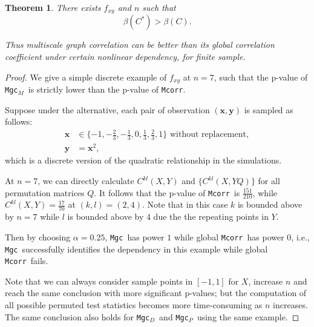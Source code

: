 \documentclass[11pt]{article}
\providecommand{\sct}[1]{{\sc \texttt{#1}}}
\providecommand{\mb}[1]{\boldsymbol{#1}}
\newcommand{\G}{C}
\newcommand{\Mgc}{\sct{Mgc}}
\newcommand{\Mgcp}{\sct{Mgc$_P$}}
\newcommand{\Mgcd}{\sct{Mgc$_D$}}
\newcommand{\Mgcm}{\sct{Mgc$_M$}}
\newcommand{\Mcorr}{\sct{Mcorr}}
\newcommand{\mbx}{\ensuremath{\mb{x}}}
\newcommand{\mby}{\ensuremath{\mb{y}}}
\newtheorem{appThm}{Theorem}
\begin{document}
\begin{appThm}
There exists $f_{xy}$ and $n$ such that
\begin{equation}
\beta(\G^{*}) > \beta(\G).
\end{equation}

Thus multiscale graph correlation can be better than its global correlation coefficient under certain nonlinear dependency, for finite sample.
\end{appThm}

\begin{proof}
We give a simple discrete example of $f_{xy}$ at $n=7$, such that the p-value of \Mgcm~is strictly lower than the p-value of \Mcorr.

Suppose under the alternative, each pair of observation $(\mbx,\mby)$ is sampled as follows:
\begin{align*}
\mbx &\in \{-1,-\frac{2}{3},-\frac{1}{3},0,\frac{1}{3},\frac{2}{3},1\} \mbox{ without replacement}, \\
\mby &= \mbx^2,
\end{align*}
which is a discrete version of the quadratic relationship in the simulations.

At $n=7$, we can directly calculate $\G^{kl}(X, Y)$ and $\{\G^{kl}(X, YQ)\}$ for all permutation matrices $Q$. It follows that the p-value of \Mcorr~is $\frac{151}{210}$, while $\G^{kl}(X, Y)=\frac{17}{70}$ at $(k,l)=(2,4)$. Note that in this case $k$ is bounded above by $n=7$ while $l$ is bounded above by $4$ due the the repeating points in $Y$.

Then by choosing $\alpha=0.25$, \Mgc~has power $1$ while global \Mcorr~has power $0$, i.e., \Mgc~successfully identifies the dependency in this example while global \Mcorr~fails.

Note that we can always consider sample points in $[-1,1]$ for $X$, increase $n$ and reach the same conclusion with more significant p-values; but the computation of all possible permuted test statistics becomes more time-consuming as $n$ increases. The same conclusion also holds for \Mgcd~and \Mgcp~using the same example.
\end{proof}


\end{document}
